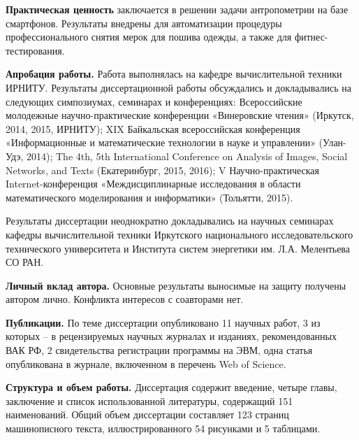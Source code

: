 \textbf{Практическая ценность} заключается в решении задачи антропометрии на базе смартфонов. Результаты внедрены для автоматизации процедуры профессионального снятия мерок для пошива одежды, а также для фитнес-тестирования.

\textbf{Апробация работы.} Работа выполнялась на кафедре вычислительной техники ИРНИТУ. Результаты диссертационной работы обсуждались и докладывались на следующих симпозиумах, семинарах и конференциях: Всероссийские молодежные научно-практические конференции «Винеровские чтения» (Иркутск, 2014, 2015, ИРНИТУ); XIX Байкальская всероссийская конференция «Информационные и математические технологии в науке и управлении» (Улан-Удэ, 2014); The 4th, 5th International Conference on Analysis of Images, Social Networks, and Texts (Екатеринбург, 2015, 2016); V Научно-практическая Internet-конференция «Междисциплинарные исследования в области математического моделирования и информатики» (Тольятти, 2015).

Результаты диссертации неоднократно докладывались на научных семинарах кафедры вычислительной техники Иркутского национального исследовательского технического университета и Института систем энергетики им. Л.А. Мелентьева СО РАН.

\textbf{Личный вклад автора.} Основные результаты выносимые на защиту получены автором лично. Конфликта интересов с соавторами нет.

\textbf{Публикации.} По теме диссертации опубликовано 11 научных работ, 3 из которых – в рецензируемых научных журналах и изданиях, рекомендованных ВАК РФ, 2 свидетельства регистрации программы на ЭВМ, одна статья опубликована в журнале, включенном в перечень Web of Science.

\textbf{Структура и объем работы.} Диссертация содержит введение, четыре главы, заключение и список использованной литературы, содержащий 151 наименований. Общий объем диссертации составляет 123 страниц машинописного текста, иллюстрированного 54 рисунками и 5 таблицами.
